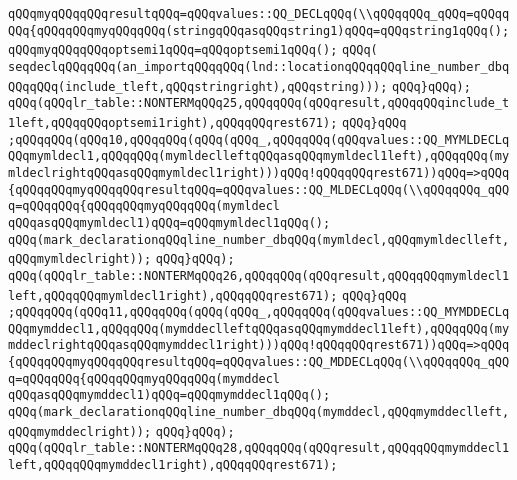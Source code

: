 \verb|qQQqmyqQQqqQQqresultqQQq=qQQqvalues::QQ_DECLqQQq(\\qQQqqQQq_qQQq=qQQqqQQq{qQQqqQQqmyqQQqqQQq(stringqQQqasqQQqstring1)qQQq=qQQqstring1qQQq();|\newline
\verb|qQQqmyqQQqqQQqoptsemi1qQQq=qQQqoptsemi1qQQq();|\newline
\verb|qQQq(|\newline
\verb|seqdeclqQQqqQQq(an_importqQQqqQQq(lnd::locationqQQqqQQqline_number_dbqQQqqQQq(include_tleft,qQQqstringright),qQQqstring)));|\newline
\verb|qQQq}qQQq);|\newline
\verb|qQQq(qQQqlr_table::NONTERMqQQq25,qQQqqQQq(qQQqresult,qQQqqQQqinclude_t1left,qQQqqQQqoptsemi1right),qQQqqQQqrest671);|\newline
\verb|qQQq}qQQq|\newline
\verb|;qQQqqQQq(qQQq10,qQQqqQQq(qQQq(qQQq_,qQQqqQQq(qQQqvalues::QQ_MYMLDECLqQQqmymldecl1,qQQqqQQq(mymldeclleftqQQqasqQQqmymldecl1left),qQQqqQQq(mymldeclrightqQQqasqQQqmymldecl1right)))qQQq!qQQqqQQqrest671))qQQq=>qQQq{qQQqqQQqmyqQQqqQQqresultqQQq=qQQqvalues::QQ_MLDECLqQQq(\\qQQqqQQq_qQQq=qQQqqQQq{qQQqqQQqmyqQQqqQQq(mymldecl|\newline
\verb|qQQqasqQQqmymldecl1)qQQq=qQQqmymldecl1qQQq();|\newline
\verb|qQQq(mark_declarationqQQqline_number_dbqQQq(mymldecl,qQQqmymldeclleft,qQQqmymldeclright));|\newline
\verb|qQQq}qQQq);|\newline
\verb|qQQq(qQQqlr_table::NONTERMqQQq26,qQQqqQQq(qQQqresult,qQQqqQQqmymldecl1left,qQQqqQQqmymldecl1right),qQQqqQQqrest671);|\newline
\verb|qQQq}qQQq|\newline
\verb|;qQQqqQQq(qQQq11,qQQqqQQq(qQQq(qQQq_,qQQqqQQq(qQQqvalues::QQ_MYMDDECLqQQqmymddecl1,qQQqqQQq(mymddeclleftqQQqasqQQqmymddecl1left),qQQqqQQq(mymddeclrightqQQqasqQQqmymddecl1right)))qQQq!qQQqqQQqrest671))qQQq=>qQQq{qQQqqQQqmyqQQqqQQqresultqQQq=qQQqvalues::QQ_MDDECLqQQq(\\qQQqqQQq_qQQq=qQQqqQQq{qQQqqQQqmyqQQqqQQq(mymddecl|\newline
\verb|qQQqasqQQqmymddecl1)qQQq=qQQqmymddecl1qQQq();|\newline
\verb|qQQq(mark_declarationqQQqline_number_dbqQQq(mymddecl,qQQqmymddeclleft,qQQqmymddeclright));|\newline
\verb|qQQq}qQQq);|\newline
\verb|qQQq(qQQqlr_table::NONTERMqQQq28,qQQqqQQq(qQQqresult,qQQqqQQqmymddecl1left,qQQqqQQqmymddecl1right),qQQqqQQqrest671);|\newline
